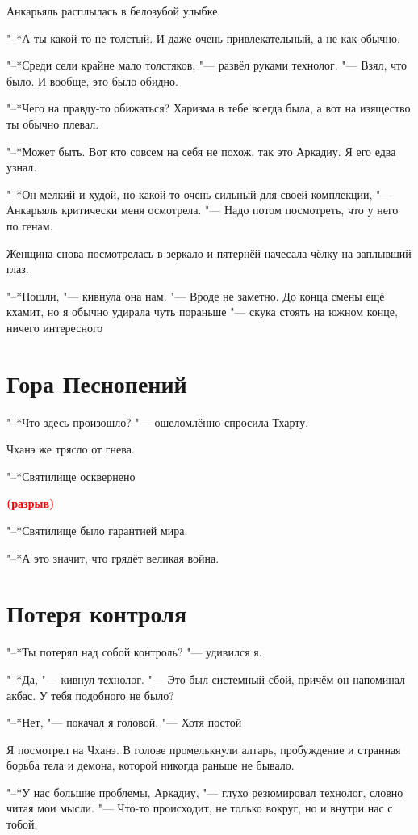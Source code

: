 \documentclass[a4paper,10pt]{book}
\newcommand{\ldotst}{\so{...}\xspace}
\newcommand{\spacing}{\textcolor{red}{\textbf{(разрыв)}}}
\begin{document}
Анкарьяль расплылась в белозубой улыбке.

"--*А ты какой-то не толстый. И даже очень привлекательный, а не как обычно.

"--*Среди сели крайне мало толстяков, "--- развёл руками технолог. "--- 
Взял, что было. И вообще, это было обидно.

"--*Чего на правду-то обижаться? Харизма в тебе всегда была, а вот на изящество ты обычно плевал.

"--*Может быть. Вот кто совсем на себя не похож, так это Аркадиу. Я его едва узнал.

"--*Он мелкий и худой, но какой-то очень сильный для своей комплекции, "--- 
Анкарьяль критически меня осмотрела.
"--- Надо потом посмотреть, что у него по генам.

Женщина снова посмотрелась в зеркало и пятернёй начесала чёлку на заплывший 
глаз.

"--*Пошли, "--- кивнула она нам. "--- Вроде не заметно. До конца смены ещё 
кхамит, но я обычно удирала чуть пораньше "---
скука стоять на южном конце, ничего интересного\ldotst

\section{Гора Песнопений}
 
"--*Что здесь произошло? "--- ошеломлённо спросила Тхарту.

Чханэ же трясло от гнева.

"--*Святилище осквернено\ldotst

\spacing

"--*Святилище было гарантией мира.

"--*А это значит, что грядёт великая война.
 
\section{Потеря контроля}
 
"--*Ты потерял над собой контроль? "--- удивился я.

"--*Да, "--- кивнул технолог. "--- Это был системный сбой, причём он напоминал 
акбас. У тебя подобного не было?

"--*Нет, "--- покачал я головой. "--- Хотя постой\ldotst

Я посмотрел на Чханэ. В голове промелькнули алтарь, пробуждение и странная 
борьба тела и демона, которой никогда раньше не бывало.

"--*У нас большие проблемы, Аркадиу, "--- глухо резюмировал технолог, словно 
читая мои мысли. "--- Что-то происходит, не только вокруг, но и внутри нас с 
тобой.
\end{document}
